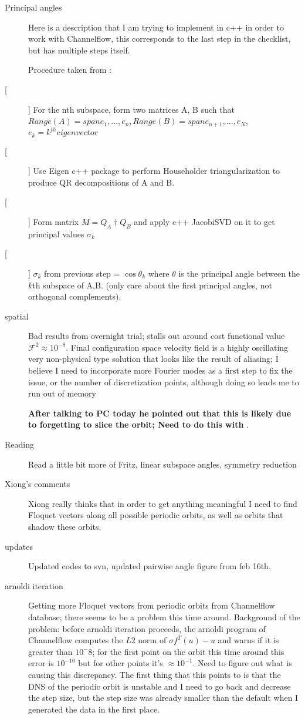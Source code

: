 \begin{description}
{\begin{description}
\item[Principal angles]
Here is a description that I am trying to implement in c++ in order to work with Channelflow, this corresponds to the
last step in the checklist, but has multiple steps itself.

Procedure taken from :
\item[[]] For the nth subspace, form two matrices A, B such that $Range(A) = span{e_1, ..., e_n},
            Range(B) = span{e_{n+1}, ... , e_N}$, $e_k = k^{th} eigenvector$
\item[[]] Use Eigen c++ package to perform Householder triangularization to produce QR decompositions of A and B.
\item[[]] Form matrix $M = Q_A{\dagger}Q_B$ and apply c++ JacobiSVD on it to get principal values $\sigma_k$
\item[[]] $\sigma_k$ from previous step = $\cos \theta_k$ where $\theta$ is the principal angle between the $k$th subspace of A,B.
          (only care about the first principal angles, not orthogonal complements).

\item[spatial {\descent}]
Bad results from overnight trial; stalls out around
cost functional value $\mathcal{F}^2 \approx 10^{-8}$. Final configuration
space velocity field is a highly oscillating very non-physical
 type solution that looks like the result of aliasing; I believe I need
to incorporate more Fourier modes as a first step to fix the
 issue, or the number of discretization points, although doing so leads me
to run out of memory

\textbf{After talking to PC today he pointed out that
this is likely due to forgetting to slice the orbit; Need to do this with {\fFslice}}.

\item[Reading]
Read a little bit more of Fritz, linear subspace
angles, symmetry reduction

\item[Xiong's comments]
Xiong really thinks that in order to get anything meaningful I
need to find Floquet vectors along all possible periodic orbits, as
well as orbits that shadow these orbits.

\item[updates]
Updated codes to svn, updated pairwise angle figure from feb 16th.

\item[arnoldi iteration]
Getting more Floquet vectors from periodic orbits from Channelflow database; there seems to be a problem this time around.
Background of the problem:
before arnoldi iteration proceeds, the arnoldi program of Channelflow
computes the $L2$ norm of $\sigma f^{T}(u)-u$ and
warns if it is greater than $10^-8$; for the first point on the orbit
this time around this error is $10^{-10}$ but for other
points it's $\approx 10^{-1}$. Need to figure out what is causing
this discrepancy. The first thing that this points to is that
the DNS of the periodic orbit is unstable and I need to go back
and decrease the step size, but the step size was already smaller
than the default when I generated the data in the first place.



\end{description}}
\end{description}
